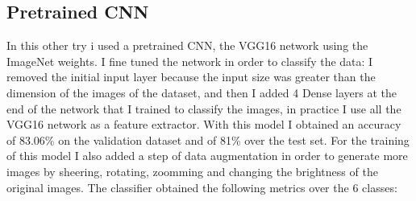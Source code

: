 \documentclass[12pt,journal,compsoc]{IEEEtran}
\begin{document}
\subsection{Pretrained CNN}
In this other try i used a pretrained CNN, the VGG16 network using the ImageNet weights. I fine tuned the network in order to classify the data: I removed the initial input layer because the input size was greater than the dimension of the images of the dataset, and then I added 4 Dense layers at the end of the network that I trained to classify the images, in practice I use all the VGG16 network as a feature extractor. With this model I obtained an accuracy of 83.06\% on the validation dataset and of 81\% over the test set.
For the training of this model I also added a step of data augmentation in order to generate more images by sheering, rotating, zoomming and changing the brightness of the original images.
The classifier obtained the following metrics over the 6 classes:
\end{document}
